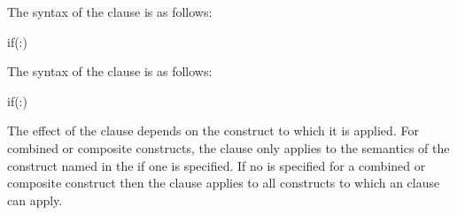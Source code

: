 \clearpage  %
\syntax
\begin{ccppspecific}

The syntax of the  clause is as follows:

\begin{ompSyntax}
if(\plc{[ directive-name-modifier }:\plc{] scalar-expression})
\end{ompSyntax}
\end{ccppspecific}

\begin{fortranspecific}

The syntax of the  clause is as follows:

\begin{ompSyntax}
if(\plc{[ directive-name-modifier }:\plc{] scalar-logical-expression})
\end{ompSyntax}
\end{fortranspecific}

\descr
The effect of the  clause depends on the construct to
which it is applied. For combined or composite constructs, the
 clause only applies to the semantics of the construct
named in the  if one is specified.
If no   is specified for a combined
or composite construct then the  clause applies to all
constructs to which an  clause can apply.




